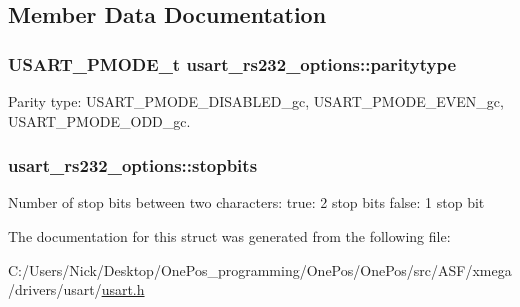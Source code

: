 \subsection{Member Data Documentation}
\hypertarget{structusart__rs232__options_ad9872b97ddc8f3dee1b7a06d9bcd5898}{
\subsubsection[{paritytype}]{\setlength{\rightskip}{0pt plus 5cm}U\-S\-A\-R\-T\-\_\-\-P\-M\-O\-D\-E\-\_\-t usart\-\_\-rs232\-\_\-options\-::paritytype}}\label{structusart__rs232__options_ad9872b97ddc8f3dee1b7a06d9bcd5898}
Parity type\-: U\-S\-A\-R\-T\-\_\-\-P\-M\-O\-D\-E\-\_\-\-D\-I\-S\-A\-B\-L\-E\-D\-\_\-gc, U\-S\-A\-R\-T\-\_\-\-P\-M\-O\-D\-E\-\_\-\-E\-V\-E\-N\-\_\-gc, U\-S\-A\-R\-T\-\_\-\-P\-M\-O\-D\-E\-\_\-\-O\-D\-D\-\_\-gc. \hypertarget{structusart__rs232__options_a3a0fe9aca38d09ec813931463f03394d}{
\subsubsection[{stopbits}]{ usart\-\_\-rs232\-\_\-options\-::stopbits}}\label{structusart__rs232__options_a3a0fe9aca38d09ec813931463f03394d}
Number of stop bits between two characters\-: true\-: 2 stop bits false\-: 1 stop bit 

The documentation for this struct was generated from the following file\-:\begin{DoxyCompactItemize}
\item 
C\-:/\-Users/\-Nick/\-Desktop/\-One\-Pos\-\_\-programming/\-One\-Pos/\-One\-Pos/src/\-A\-S\-F/xmega/drivers/usart/\hyperlink{usart_8h}{usart.\-h}\end{DoxyCompactItemize}
